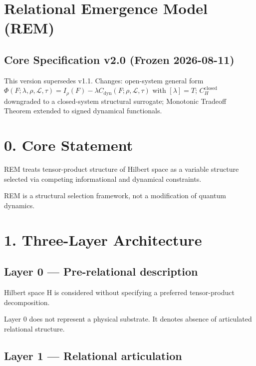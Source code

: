 \documentclass[
]{article}
\author{}
\date{}
\begin{document}
\section{Relational Emergence Model
(REM)}\label{relational-emergence-model-rem}

\subsection{Core Specification v2.0 (Frozen 2026-08-11)}\label{core-specification-v2.0}

This version supersedes v1.1. Changes: open-system general form
$\Phi(F;\lambda,\rho,\mathcal L,\tau) = I_\rho(F) - \lambda C_{\mathrm{dyn}}(F;\rho,\mathcal L,\tau)$
with $[\lambda] = T$;
$C_H^{\mathrm{closed}}$ downgraded to a closed-system structural surrogate;
Monotonic Tradeoff Theorem extended to signed dynamical functionals.

\section{0. Core Statement}\label{core-statement}

REM treats tensor-product structure of Hilbert space as a variable
structure selected via competing informational and dynamical
constraints.

REM is a structural selection framework, not a modification of quantum
dynamics.

\section{1. Three-Layer Architecture}\label{three-layer-architecture}

\subsection{Layer 0 --- Pre-relational
description}\label{layer-0-pre-relational-description}

Hilbert space H is considered without specifying a preferred
tensor-product decomposition.

Layer 0 does not represent a physical substrate. It denotes absence of
articulated relational structure.

\subsection{Layer 1 --- Relational
articulation}\label{layer-1-relational-articulation}
\end{document}
